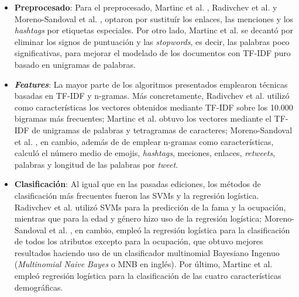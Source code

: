 \begin{itemize}
	\item \textbf{Preprocesado}: Para el preprocesado, Martinc et al. \cite{martinc2019hot}, Radivchev et al. \cite{radivchev2019celebrity}
	      y Moreno-Sandoval et al. \cite{moreno2019celebrity}, optaron por sustituír los enlaces,
	      las menciones y los \textit{hashtags} por etiquetas especiales. Por otro lado, Martinc et al. \cite{martinc2019hot} se decantó por eliminar los signos de puntuación
	      y las \textit{stopwords}, es decir, las palabras poco significativas, para mejorar el modelado de los documentos con TF-IDF puro basado en unigramas de palabras.
	\item \textbf{\textit{Features}}: La mayor parte de los algoritmos presentados emplearon técnicas basadas en TF-IDF y n-gramas.
	      Más concretamente, Radivchev et al. \cite{radivchev2019celebrity} utilizó como características los vectores obtenidos mediante TF-IDF sobre los 10.000 bigramas más frecuentes;
	      Martinc et al. \cite{martinc2019hot} obtuvo los vectores mediante el TF-IDF de unigramas de palabras y tetragramas de caracteres; Moreno-Sandoval et al. \cite{moreno2019celebrity}, en cambio, además de
	      de emplear n-gramas como características, calculó el número medio de emojis, \textit{hashtags}, meciones, enlaces, \textit{retweets}, palabras y longitud de las
	      palabras por \textit{tweet}.
	\item \textbf{Clasificación}: Al igual que en las pasadas ediciones, los métodos de clasificación más frecuentes fueron las
	      SVMs y la regresión logística. Radivchev et al. \cite{radivchev2019celebrity} utilizó SVMs para la predicción de la fama y la ocupación, mientras que para la edad y género
	      hizo uso de la regresión logística; Moreno-Sandoval et al. \cite{moreno2019celebrity}, en cambio, empleó la regresión logística para la clasificación de todos los atributos
	      excepto para la ocupación, que obtuvo mejores resultados haciendo uso de un clasificador multinomial Bayesiano Ingenuo (\textit{Multinomial Naive Bayes} o MNB en inglés).
	      Por último, Martinc et al. \cite{martinc2019hot} empleó regresión logística para la clasificación de las cuatro características demográficas.
\end{itemize}

